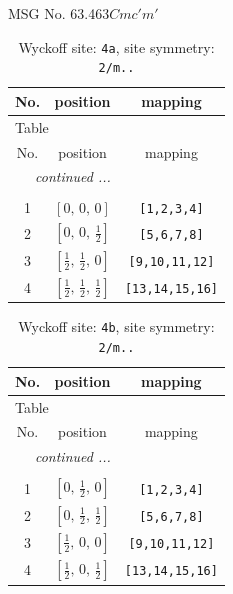 \documentclass[fleqn,8pt]{jsarticle}
\begin{document}
\setcounter{MaxMatrixCols}{32}

\renewcommand{\tablename}{Table~}
\renewcommand{\figurename}{Figure~}
\begin{center}
\LARGE
MSG No. 63.463\quad$Cmc'm'$
\end{center}
\renewcommand{\arraystretch}{1.2}
\begin{longtable}{ccc}
\caption{Wyckoff site: {\tt 4a}, site symmetry: {\tt 2/m..}}
 \\
 \hline \hline
No. & position & mapping \\ \hline \endfirsthead

\multicolumn{2}{l}{\tablename\ \thetable{}} \\
 \hline \hline
No. & position & mapping \\ \hline \endhead

 \hline \hline
\multicolumn{2}{r}{\footnotesize\it continued ...} \\ \endfoot

 \hline \hline
\multicolumn{2}{r}{} \\ \endlastfoot

1 & $\left[ 0,\, 0,\, 0 \right]$ & {\tt [1,2,3,4]} \\ \hline
2 & $\left[ 0,\, 0,\, \frac{1}{2} \right]$ & {\tt [5,6,7,8]} \\ \hline
3 & $\left[ \frac{1}{2},\, \frac{1}{2},\, 0 \right]$ & {\tt [9,10,11,12]} \\ \hline
4 & $\left[ \frac{1}{2},\, \frac{1}{2},\, \frac{1}{2} \right]$ & {\tt [13,14,15,16]} \\
\end{longtable}
\renewcommand{\arraystretch}{1.2}
\begin{longtable}{ccc}
\caption{Wyckoff site: {\tt 4b}, site symmetry: {\tt 2/m..}}
 \\
 \hline \hline
No. & position & mapping \\ \hline \endfirsthead

\multicolumn{2}{l}{\tablename\ \thetable{}} \\
 \hline \hline
No. & position & mapping \\ \hline \endhead

 \hline \hline
\multicolumn{2}{r}{\footnotesize\it continued ...} \\ \endfoot

 \hline \hline
\multicolumn{2}{r}{} \\ \endlastfoot

1 & $\left[ 0,\, \frac{1}{2},\, 0 \right]$ & {\tt [1,2,3,4]} \\ \hline
2 & $\left[ 0,\, \frac{1}{2},\, \frac{1}{2} \right]$ & {\tt [5,6,7,8]} \\ \hline
3 & $\left[ \frac{1}{2},\, 0,\, 0 \right]$ & {\tt [9,10,11,12]} \\ \hline
4 & $\left[ \frac{1}{2},\, 0,\, \frac{1}{2} \right]$ & {\tt [13,14,15,16]} \\
\end{longtable}
\end{document}
